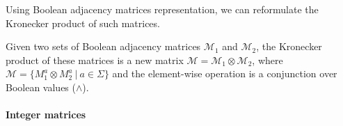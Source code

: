 Using Boolean adjacency matrices representation, we can reformulate the Kronecker product of such matrices.

\begin{definition}
\label{def:bool:product}
Given two sets of Boolean adjacency matrices $\mathcal{M}_1$ and $\mathcal{M}_2$, the  Kronecker product of these matrices is a new matrix
$\mathcal{M} = \mathcal{M}_1 \otimes \mathcal{M}_2$, where $\mathcal{M} = \{ M_1^a \otimes M_2^a~|~a \in \Sigma \}$ and the element-wise operation is a conjunction over Boolean values ($\wedge$).
\end{definition}

\paragraph*{Integer matrices}

